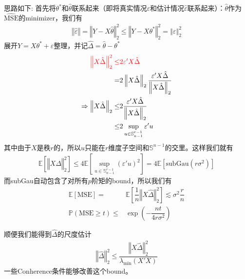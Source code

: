 \documentclass[11pt,a4paper]{ctexart}
\numberwithin{equation}{section}%
\begin{document}
思路如下: 首先将$ \theta ^* $和$ \hat{\theta } $联系起来（即将真实情况$ \varepsilon  $和估计情况$ \hat{\varepsilon } $联系起来）：$ \hat{\theta } $作为$ \hat{\mathrm{MSE}  } $的minimizer，我们有
    \begin{align*}
        \left\Vert \hat{\varepsilon } \right\Vert = \left\Vert Y-X\hat{\theta } \right\Vert _2^2 \leq \left\Vert Y-X\theta ^* \right\Vert _2^2 = \left\Vert \varepsilon  \right\Vert _2^2 
    \end{align*}
    展开$ Y=X\theta ^*+\varepsilon  $整理，并记$ \hat{\Delta }= \hat{\theta }-\theta ^* $
    \begin{align*}
         \color{red}\left\Vert X\hat{\Delta } \right\Vert _2^2 \leq &\color{red} 2\varepsilon 'X\hat{\Delta } \\
         =& 2 \left\Vert X\hat{\Delta } \right\Vert _2 \dfrac{ \varepsilon 'X\hat{\Delta } }{  \left\Vert X\hat{\Delta } \right\Vert _2 } \\
          \Rightarrow \left\Vert X\hat{\Delta } \right\Vert _2\leq & 2 \dfrac{ \varepsilon 'X\hat{\Delta } }{  \left\Vert X\hat{\Delta } \right\Vert _2 } \\
          \leq & 2 \mathop{ \sup  }\limits_{u\in \mathbb{S}^{r-1}_{n-1}}  \varepsilon 'u 
    \end{align*}
    其中由于$ X $是秩$ r $的，所以$ u $只能在$ r $维度子空间和$ \mathbb{S}^{n-1} $的交里。这样我们就有
    \begin{align*}
        \mathbb{E}\left[ \left\Vert X\hat{\Delta } \right\Vert _2^2 \right]  \leq 4\mathbb{E}\left[ \mathop{ \sup  }\limits_{u\in \mathbb{S}^{r-1}_{n-1}}  (\varepsilon 'u)^2 \right]=4\mathbb{E}\left[  \mathrm{ subGau }(r\sigma ^2)  \right] 
    \end{align*}
    而subGau自动包含了对所有$ p $阶矩的bound，所以我们有
    \begin{align*}
        \mathbb{E}\left[ \mathrm{MSE}   \right] =& \mathbb{E}\left[ \dfrac{ 1 }{ n } \left\Vert X\hat{\Delta } \right\Vert _2^2 \right]  \lesssim \sigma ^2 \dfrac{ r  }{ n } \\
        \mathbb{P}\left( \mathrm{MSE} \geq t \right) \leq & \exp\left( -\dfrac{ n t }{ 4r\sigma ^2 } \right)
    \end{align*}
    
    顺便我们能得到$ \hat{\Delta } $的尺度估计
    \begin{align*}
        \left\Vert \hat{\Delta } \right\Vert _2^2 \leq \dfrac{ \left\Vert X\hat{\Delta } \right\Vert _2^2 }{ \lambda _{\min}(X'X) }
    \end{align*}
    一些Conherence条件能够改善这个bound。
    
\end{document}
